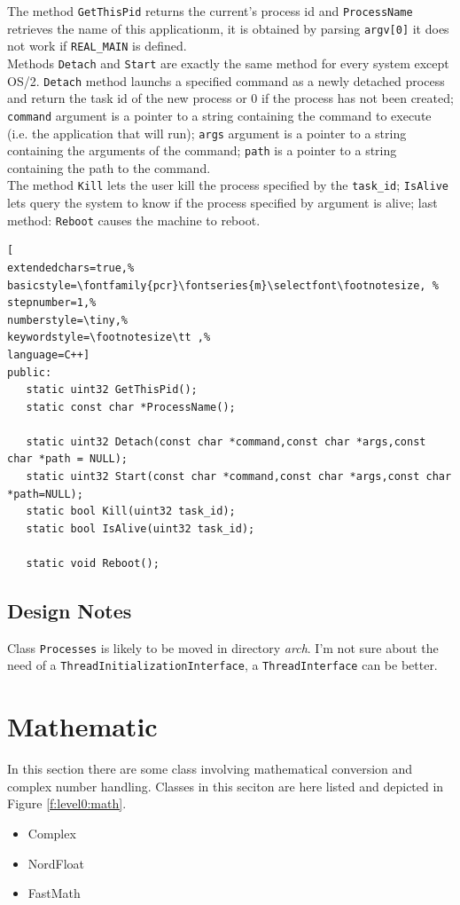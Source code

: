 The method \texttt{GetThisPid} returns the current's process id and \texttt{ProcessName} retrieves the name of this applicationm, it is obtained by parsing \texttt{argv[0]} it does not work if \texttt{REAL\_MAIN} is defined.\\

Methods \texttt{Detach} and \texttt{Start} are exactly the same method for every system except OS/2. \texttt{Detach} method launchs a specified command as a newly detached process and return the task id of the new process or 0 if the process has not been created; \texttt{command} argument is a pointer to a string containing the command to execute (i.e. the application that will run); \texttt{args} argument is a pointer to a string containing the arguments of the command; \texttt{path} is a pointer to a string containing the path to the command. \\

The method \texttt{Kill} lets the user kill the process specified by the \texttt{task\_id}; \texttt{IsAlive} lets query the system to know if the process specified by argument is alive; last method: \texttt{Reboot} causes the machine to reboot.

\begin{lstlisting}[
extendedchars=true,%
basicstyle=\fontfamily{pcr}\fontseries{m}\selectfont\footnotesize, %
stepnumber=1,%
numberstyle=\tiny,%
keywordstyle=\footnotesize\tt ,%
language=C++]
public:
   static uint32 GetThisPid();
   static const char *ProcessName();
   
   static uint32 Detach(const char *command,const char *args,const char *path = NULL);
   static uint32 Start(const char *command,const char *args,const char *path=NULL);
   static bool Kill(uint32 task_id);
   static bool IsAlive(uint32 task_id);

   static void Reboot();
\end{lstlisting}



\subsection{Design Notes}

Class \texttt{Processes} is likely to be moved in directory \textit{arch}. I'm not sure about the need of a \texttt{ThreadInitializationInterface}, a \texttt{ThreadInterface} can be better.



\section{Mathematic}
In this section there are some class involving mathematical conversion and complex number handling. Classes in this seciton are here listed and depicted in Figure \ref{f:level0:math}.
\begin{itemize}
 \item Complex
 \item NordFloat
 \item FastMath
\end{itemize}

